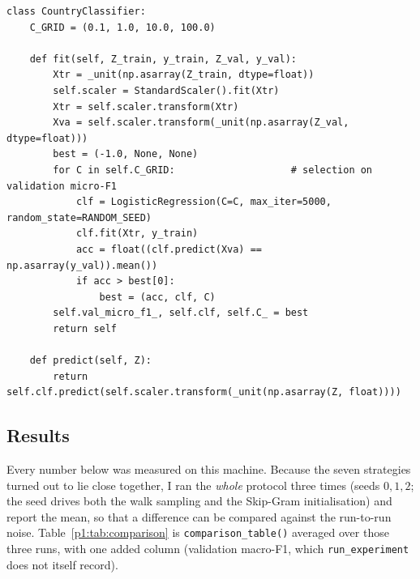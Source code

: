\begin{lstlisting}[style=p1code,caption={TODO 3b --- \texttt{CountryClassifier}}]
class CountryClassifier:
    C_GRID = (0.1, 1.0, 10.0, 100.0)

    def fit(self, Z_train, y_train, Z_val, y_val):
        Xtr = _unit(np.asarray(Z_train, dtype=float))
        self.scaler = StandardScaler().fit(Xtr)
        Xtr = self.scaler.transform(Xtr)
        Xva = self.scaler.transform(_unit(np.asarray(Z_val, dtype=float)))
        best = (-1.0, None, None)
        for C in self.C_GRID:                    # selection on validation micro-F1
            clf = LogisticRegression(C=C, max_iter=5000, random_state=RANDOM_SEED)
            clf.fit(Xtr, y_train)
            acc = float((clf.predict(Xva) == np.asarray(y_val)).mean())
            if acc > best[0]:
                best = (acc, clf, C)
        self.val_micro_f1_, self.clf, self.C_ = best
        return self

    def predict(self, Z):
        return self.clf.predict(self.scaler.transform(_unit(np.asarray(Z, float))))
\end{lstlisting}

\subsection{Results}
\label{p1:sec:results}

Every number below was measured on this machine.  Because the seven strategies turned out
to lie close together, I ran the \emph{whole} protocol three times (seeds $0,1,2$; the
seed drives both the walk sampling and the Skip-Gram initialisation) and report the mean,
so that a difference can be compared against the run-to-run noise.  Table~\ref{p1:tab:comparison}
is \texttt{comparison\_table()} averaged over those three runs, with one added column
(validation macro-F1, which \texttt{run\_experiment} does not itself record).


